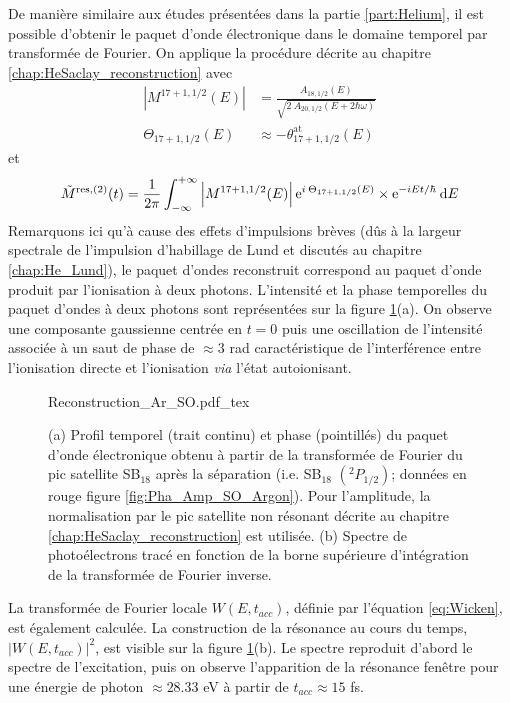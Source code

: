 De manière similaire aux études présentées dans la partie \ref{part:Helium}, il est possible d'obtenir le paquet d'onde électronique dans le domaine temporel par transformée de Fourier. On applique la procédure décrite au chapitre \ref{chap:HeSaclay_reconstruction} avec 
\begin{align}
\left| M^{17+1,1/2}(E)\right| & = \frac{A_{18,1/2}(E)}{\sqrt{2 \: A_{20,1/2}(E + 2 \hbar \omega)}} \\ 
\Theta_{17+1,1/2} (E) & \approx - \theta^{\text{at}}_{17+1,1/2}(E)
\end{align}
et
\begin{equation}
\tilde{M}^{\text{res},(2)}(t) = \frac{1}{2 \pi} \int_{- \infty}^{+ \infty} \left| M^{17+1,1/2}(E) \right| \mathrm{e}^{i \: \Theta_{17+1,1/2} (E)} \times \mathrm{e}^{-i E t / \hbar} \: \mathrm{d} E
\end{equation}
Remarquons ici qu'à cause des effets d'impulsions brèves (dûs à la largeur spectrale de l'impulsion d'habillage de Lund et discutés au chapitre \ref{chap:He_Lund}), le paquet d'ondes reconstruit correspond au paquet d'onde produit par l'ionisation à deux photons. L'intensité et la phase temporelles du paquet d'ondes à deux photons sont représentées sur la figure \ref{fig:Reconstruction_Ar_SO}(a). On observe une composante gaussienne centrée en $t=0$ puis une oscillation de l'intensité associée à un saut de phase de $\approx 3$ rad caractéristique de l'interférence entre l'ionisation directe et l'ionisation \textit{via} l'état autoionisant.

\begin{figure}[ht]
\centering
\def\svgwidth{0.7\textwidth}
{Reconstruction_Ar_SO.pdf_tex}
\caption{(a) Profil temporel (trait continu) et phase (pointillés) du paquet d'onde électronique obtenu à partir de la transformée de Fourier du pic satellite SB$_{18}$ après la séparation (i.e. SB$_{18}$ $(^{2}P_{1/2})$; données en rouge figure \ref{fig:Pha_Amp_SO_Argon}). Pour l'amplitude, la normalisation par le pic satellite non résonant décrite au chapitre \ref{chap:HeSaclay_reconstruction} est utilisée. (b) Spectre de photoélectrons tracé en fonction de la borne supérieure d'intégration de la transformée de Fourier inverse.}
\label{fig:Reconstruction_Ar_SO}
\end{figure}

La transformée de Fourier locale $W(E,t_{acc})$, définie par l'équation \ref{eq:Wicken}, est également calculée. La construction de la résonance au cours du temps, $|W(E,t_{acc})|^2$, est visible sur la figure \ref{fig:Reconstruction_Ar_SO}(b). Le spectre reproduit d'abord le spectre de l'excitation, puis on observe l'apparition de la résonance fenêtre pour une énergie de photon $\approx 28.33$ eV à partir de $t_{acc} \approx 15$ fs.

